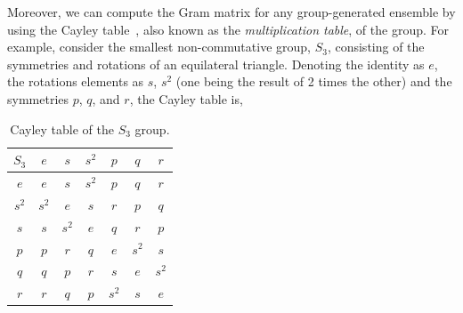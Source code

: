 \documentclass[12pt,letterpaper]{article}
\begin{document}
\begin{multicols}{2}
Moreover, we can compute the Gram matrix for any group-generated ensemble by using the Cayley table~\cite{CayleyTable}, also known as the \emph{multiplication table}, of the group. For example, consider the smallest non-commutative group, $S_3$, consisting of the symmetries and rotations of an equilateral triangle. Denoting the identity as $e$, the rotations elements as $s$, $s^2$ (one being the result of 2 times the other) and the symmetries $p$, $q$, and $r$, the Cayley table is,

\begin{table}[H]
	\centering
	\caption{Cayley table of the $S_3$ group.}
	\begin{tabular}{c||c c c c c c}
        $S_3$ & $e$ & $s$ & $s^2$ & $p$ & $q$ & $r$ \\\hline\hline
        $e$   & $e$ & $s$ & $s^2$ & $p$ & $q$ & $r$ \\
        $s^2$ & $s^2$ & $e$ & $s$ & $r$ & $p$ & $q$ \\
        $s$   & $s$ & $s^2$ & $e$ & $q$ & $r$ & $p$ \\
        $p$   & $p$ & $r$ & $q$ & $e$ & $s^2$ & $s$ \\
        $q$   & $q$ & $p$ & $r$ & $s$ & $e$ & $s^2$ \\
        $r$   & $r$ & $q$ & $p$ & $s^2$ & $s$ & $e$
    \end{tabular}
\end{table}


\end{multicols}
\end{document}
